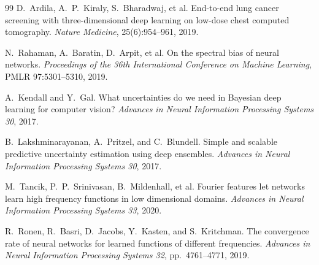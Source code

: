 \documentclass[9pt,twocolumn]{article}
\theoremstyle{remark}
\theoremstyle{definition}
\newcommand{\澔}{%
  \hbox{%
    \scalebox{0.75}[1]{氵}%
    \kern -0.3em%
    \scalebox{0.8}[1]{皓}%
  }%
}
\begin{document}
\begin{thebibliography}{99}
D.~Ardila, A.~P.~Kiraly, S.~Bharadwaj, et al.
\newblock End-to-end lung cancer screening with three-dimensional deep learning on low-dose chest computed tomography.
\newblock \textit{Nature Medicine}, 25(6):954--961, 2019.

N.~Rahaman, A.~Baratin, D.~Arpit, et al.
\newblock On the spectral bias of neural networks.
\newblock \textit{Proceedings of the 36th International Conference on Machine Learning}, PMLR 97:5301--5310, 2019.

A.~Kendall and Y.~Gal.
\newblock What uncertainties do we need in Bayesian deep learning for computer vision?
\newblock \textit{Advances in Neural Information Processing Systems 30}, 2017.

B.~Lakshminarayanan, A.~Pritzel, and C.~Blundell.
\newblock Simple and scalable predictive uncertainty estimation using deep ensembles.
\newblock \textit{Advances in Neural Information Processing Systems 30}, 2017.

M.~Tancik, P.~P.~Srinivasan, B.~Mildenhall, et al.
\newblock Fourier features let networks learn high frequency functions in low dimensional domains.
\newblock \textit{Advances in Neural Information Processing Systems 33}, 2020.

R.~Ronen, R.~Basri, D.~Jacobs, Y.~Kasten, and S.~Kritchman.
\newblock The convergence rate of neural networks for learned functions of different frequencies.
\newblock \textit{Advances in Neural Information Processing Systems 32}, pp.~4761--4771, 2019.

\end{thebibliography}
\endgroup
\end{document}

